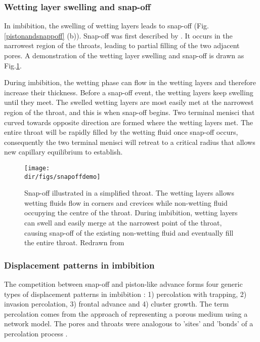 \subsubsection{Wetting layer swelling and snap-off}
In imbibition, the swelling of wetting layers leads to snap-off (Fig.\ref{pistonandsnappoff} (b)). Snap-off was first described by \citet{pickell1966application}. It occurs in the narrowest region of the throats, leading to partial filling of the two adjacent pores. A demonstration of the wetting layer swelling and snap-off is drawn as Fig.\ref{snapoffdemo}.

During imbibition, the wetting phase can flow in the wetting layers and therefore increase their thickness. Before a snap-off event, the wetting layers keep swelling until they meet. The swelled wetting layers are most easily met at the narrowest region of the throat, and this is when snap-off begins. Two terminal menisci that curved towards opposite direction are formed where the wetting layers met. The entire throat will be rapidly filled by the wetting fluid once snap-off occurs, consequently the two terminal menisci will retreat to a critical radius that allows new capillary equilibrium to establish.

\begin{figure}[htbp]
  \centering
  \texttt{[image: \\dir/figs/snapoffdemo]}
  \caption{Snap-off illustrated in a simplified throat. The wetting layers allows wetting fluids flow in corners and crevices while non-wetting fluid occupying the centre of the throat. During imbibition, wetting layers can swell and easily merge at the narrowest point of the throat, causing snap-off of the existing non-wetting fluid and eventually fill the entire throat. Redrawn from \citet{blunt2017multiphase}}
  \label{snapoffdemo}
\end{figure}

\subsubsection{Displacement patterns in imbibition}
The competition between snap-off and piston-like advance forms four generic types of displacement patterns in imbibition \citep{chandler1982capillary,lenormand1984role,cieplak1988dynamical,cieplak1990influence}: 1) percolation with trapping, 2) invasion percolation, 3) frontal advance and 4) cluster growth. The term percolation comes from the approach of representing a porous medium using a network model. The pores and throats were analogous to 'sites' and 'bonds' of a percolation process \citep{broadbent1957percolation}.

